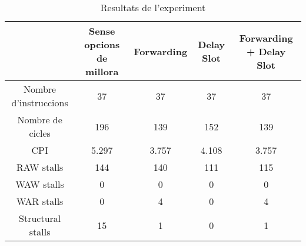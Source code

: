 \documentclass{article}
\begin{document}
\begin{table}[!h]
\centering
\begin{tabular}{|c|c|c|c|c|}
\hline
 & Sense opcions de millora &Forwarding  &Delay Slot  &Forwarding + Delay Slot   \\
 \hline
 Nombre d'instruccions &37  &37  &37 &37  \\
 \hline
 Nombre de cicles &196               &139  &152  &139   \\
 \hline
 CPI &5.297               &3.757  &4.108  &3.757   \\
 \hline
 RAW stalls &144 &140  &111  &115   \\
 \hline
 WAW stalls &0 &0 &0 &0   \\
 \hline
 WAR stalls &0 &4 &0 &4   \\
 \hline
 Structural stalls &15 &1 &0 &1\\
 \hline 
\end{tabular}
\caption{Resultats de l'experiment}
\label{tab:results}
\end{table}
\end{document}
